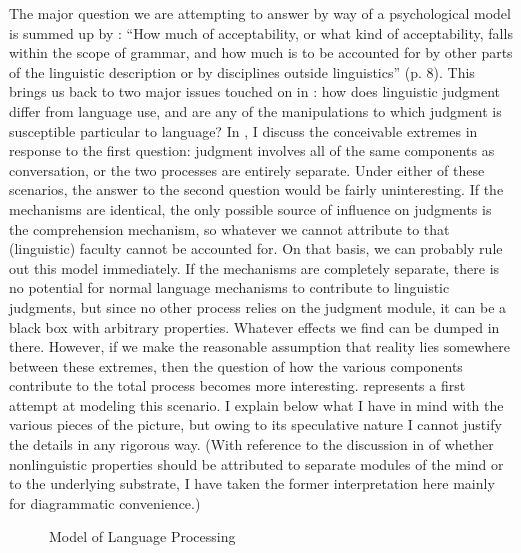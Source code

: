 The major question we are attempting to answer by way of a psychological model is summed up by \citet{Klein1979}: ``How much of acceptability, or what kind of acceptability, falls within the scope of grammar, and how much is to be accounted for by other parts of the linguistic description or by disciplines outside linguistics'' (p. 8). This brings us back to two major issues touched on in : how does linguistic judgment differ from language use, and are any of the manipulations to which judgment is susceptible particular to language? In , I discuss the conceivable extremes in response to the first question: judgment involves all of the same components as conversation, or the two processes are entirely separate. Under either of these scenarios, the answer to the second question would be fairly uninteresting. If the mechanisms are identical, the only possible source of influence on judgments is the comprehension mechanism, so whatever we cannot attribute to that (linguistic) faculty cannot be accounted for. On that basis, we can probably rule out this model immediately. If the mechanisms are completely separate, there is no potential for normal language mechanisms to contribute to linguistic judgments, but since no other process relies on the judgment module, it can be a black box with arbitrary properties. Whatever effects we find can be dumped in there. However, if we make the reasonable assumption that reality lies somewhere between these extremes, then the question of how the various components contribute to the total process becomes more interesting.  represents a first attempt at modeling this scenario. I explain below what I have in mind with the various pieces of the picture, but owing to its
speculative nature I cannot justify the details in any rigorous way. (With reference to the discussion in  of whether nonlinguistic properties should be attributed to separate modules of the mind or to the underlying substrate, I have taken the former interpretation here mainly for diagrammatic convenience.)

\begin{sidewaysfigure}
 	
 	\caption{Model of Language Processing}
  \label{fig:1}
\end{sidewaysfigure}

